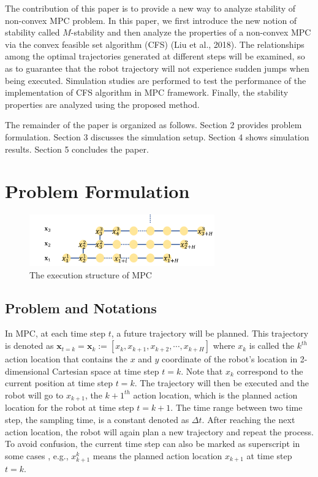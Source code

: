 \documentclass{ifacconf}
\begin{document}
The contribution of this paper is to provide a new way to analyze stability of non-convex MPC problem. In this paper, we first introduce the new notion of stability called $M$-stability and then analyze the properties of a non-convex MPC via the convex feasible set algorithm (CFS) (Liu et al., 2018).  The relationships among the optimal trajectories generated at different steps will be examined, so as to  guarantee that the robot trajectory will not experience sudden jumps when being executed. Simulation studies are performed to test the performance of the implementation of CFS  algorithm in MPC framework. Finally, the stability properties are analyzed using the proposed method.

The remainder of the paper is organized as follows. Section 2 provides problem formulation. Section 3 discusses the simulation setup. Section 4 shows simulation results. Section 5 concludes the paper.

\section{Problem Formulation}

\begin{figure}[htbp]
\begin{center}
\includegraphics[width=8cm]{src/MPCstruc.png}
\caption{The execution structure of MPC}
\label{fig: mpc}
\end{center}
\end{figure}

\subsection{Problem and Notations}
In MPC, at each time step $t$, a future trajectory will be planned. This trajectory is denoted as $\mathbf{x}_{t=k}=\mathbf{x}_{k} := [x_k, x_{k+1},x_{k+2},\cdots,x_{k+H}]$ where $x_k$ is called the $k^{th}$ action location that contains the $x$ and $y$ coordinate of the robot's location in 2-dimensional Cartesian space at time step $t=k$. Note that $x_k$ correspond to the current position at time step $t=k$. The trajectory will then be executed and the robot will go to $x_{k+1}$, the $k+1^{th}$ action location, which is the planned action location for the robot at time step $t=k+1$. The time range between two time step, the sampling time, is a constant denoted as $\Delta t$. After reaching the next action location, the robot will again plan a new trajectory and repeat the process. To avoid confusion, the current time step can also be marked as superscript in some cases , e.g., $x_{k+1}^k$ means the planned action location $x_{k+1}$ at time step $t=k$.
\end{document}
